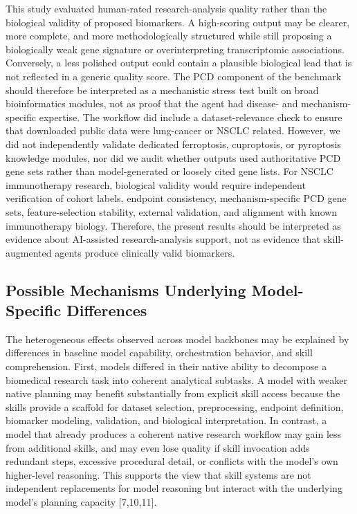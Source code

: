 \documentclass[11pt]{article}
\begin{document}
This study evaluated human-rated research-analysis quality rather than the biological validity of proposed biomarkers. A high-scoring output may be clearer, more complete, and more methodologically structured while still proposing a biologically weak gene signature or overinterpreting transcriptomic associations. Conversely, a less polished output could contain a plausible biological lead that is not reflected in a generic quality score. The PCD component of the benchmark should therefore be interpreted as a mechanistic stress test built on broad bioinformatics modules, not as proof that the agent had disease- and mechanism-specific expertise. The workflow did include a dataset-relevance check to ensure that downloaded public data were lung-cancer or NSCLC related. However, we did not independently validate dedicated ferroptosis, cuproptosis, or pyroptosis knowledge modules, nor did we audit whether outputs used authoritative PCD gene sets rather than model-generated or loosely cited gene lists. For NSCLC immunotherapy research, biological validity would require independent verification of cohort labels, endpoint consistency, mechanism-specific PCD gene sets, feature-selection stability, external validation, and alignment with known immunotherapy biology. Therefore, the present results should be interpreted as evidence about AI-assisted research-analysis support, not as evidence that skill-augmented agents produce clinically valid biomarkers.

\subsection{Possible Mechanisms Underlying Model-Specific Differences}

The heterogeneous effects observed across model backbones may be explained by differences in baseline model capability, orchestration behavior, and skill comprehension. First, models differed in their native ability to decompose a biomedical research task into coherent analytical subtasks. A model with weaker native planning may benefit substantially from explicit skill access because the skills provide a scaffold for dataset selection, preprocessing, endpoint definition, biomarker modeling, validation, and biological interpretation. In contrast, a model that already produces a coherent native research workflow may gain less from additional skills, and may even lose quality if skill invocation adds redundant steps, excessive procedural detail, or conflicts with the model's own higher-level reasoning. This supports the view that skill systems are not independent replacements for model reasoning but interact with the underlying model's planning capacity [7,10,11].
\end{document}
